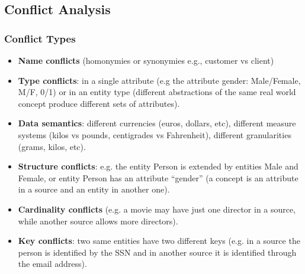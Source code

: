 \documentclass[10pt,a4paper]{article}
\begin{document}
\subsection{Conflict Analysis}
\subsubsection{Conflict Types}
\begin{itemize}
	\item \textbf{Name conflicts} (homonymies or synonymies e.g., customer vs client)
	\item \textbf{Type conflicts}: in a single attribute (e.g the attribute gender: Male/Female, M/F, 0/1) or in an entity type (different abstractions of the same real world concept produce different sets of attributes).
	\item \textbf{Data semantics}: different currencies (euros, dollars, etc), different measure systems (kilos vs pounds, centigrades vs Fahrenheit), different granularities (grams, kilos, etc).
	\item \textbf{Structure conflicts}: e.g. the entity Person is extended by entities Male and Female, or entity Person has an attribute “gender” (a concept is an attribute in a source and an entity in another one).
	\item \textbf{Cardinality conflicts} (e.g. a movie may have just one director in a source, while another source allows more directors).
	\item \textbf{Key conflicts}: two same entities have two different keys (e.g. in a source the person is identified by the SSN and in another source it is identified through the email address).
\end{itemize}
\end{document}

